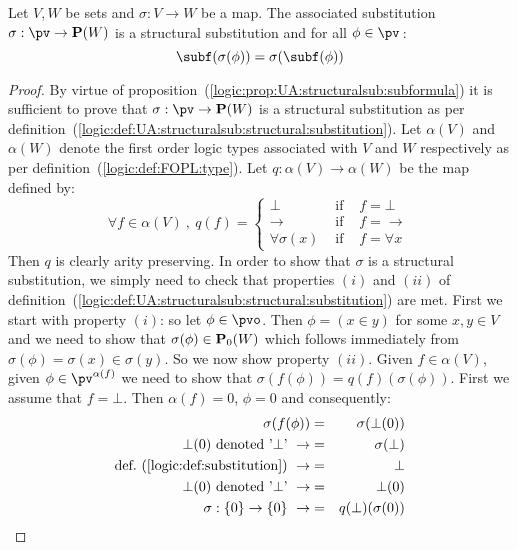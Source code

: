 \begin{prop}\label{logic:prop:FOPL:substitution:subformula}
Let $V,W$ be sets and $\sigma:V\to W$ be a map. The associated
substitution $\sigma:\pv\to{\bf P}(W)$ is a structural substitution
and for all $\phi\in\pv$\,:
    \[
        \subf(\sigma(\phi))
        =
        \sigma(\subf(\phi))
    \]
\end{prop}
\begin{proof}
By virtue of
proposition~(\ref{logic:prop:UA:structuralsub:subformula}) it is
sufficient to prove that $\sigma:\pv\to{\bf P}(W)$ is a structural
substitution as per
definition~(\ref{logic:def:UA:structuralsub:structural:substitution}).
Let $\alpha(V)$ and $\alpha(W)$ denote the first order logic types
associated with $V$ and $W$ respectively as per
definition~(\ref{logic:def:FOPL:type}). Let
$q:\alpha(V)\to\alpha(W)$ be the map defined by:
    \[
        \forall f\in\alpha(V)\ ,\ q(f)
        =
        \left\{\begin{array}{lcl}
            \bot&\mbox{\ if\ }&f=\bot
            \\
            \to&\mbox{\ if\ }&f=\to
            \\
            \forall\sigma(x)&\mbox{\ if\ }&f=\forall x
        \end{array}\right.
    \]
Then $q$ is clearly arity preserving. In order to show that $\sigma$
is a structural substitution, we simply need to check that
properties $(i)$ and $(ii)$ of
definition~(\ref{logic:def:UA:structuralsub:structural:substitution})
are met. First we start with property $(i)$: so let $\phi\in\pvo$.
Then $\phi=(x\in y)$ for some $x,y\in V$ and we need to show that
$\sigma(\phi)\in{\bf P}_{0}(W)$ which follows immediately from
$\sigma(\phi)=\sigma(x)\in\sigma(y)$. So we now show property
$(ii)$. Given $f\in\alpha(V)$, given $\phi\in\pv^{\alpha(f)}$ we
need to show that $\sigma(f(\phi))=q(f)(\sigma(\phi))$. First we
assume that $f=\bot$. Then $\alpha(f)=0$, $\phi=0$ and consequently:
    \begin{eqnarray*}
        \sigma(f(\phi))&=&\sigma(\bot(0))
        \\
        \mbox{$\bot(0)$ denoted '$\bot$'}\ \rightarrow&=&\sigma(\bot)
        \\
        \mbox{def.~(\ref{logic:def:substitution})}\ \rightarrow&=&\bot
        \\
        \mbox{$\bot(0)$ denoted '$\bot$'}\ \rightarrow&=&\bot(0)
        \\
        \sigma:\{0\}\to\{0\}\ \rightarrow&=&q(\bot)(\sigma(0))
        \\

\end{eqnarray*}
\end{proof}
